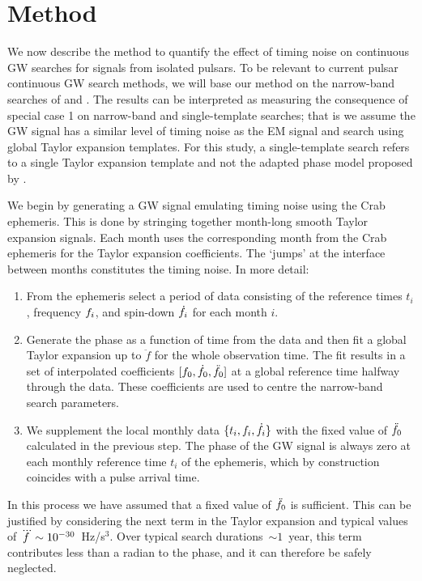 \documentclass[../full_thesis/full_thesis.tex]{subfiles}
\begin{document}
\section{Method}
\label{sec: narrow-band method}
We now describe the method to quantify the effect of timing noise on continuous GW
searches for signals from isolated pulsars.
To be relevant to current pulsar continuous GW search methods, we will base our
method on the narrow-band searches of \citet{abbott2008beating} and \citet{aasi2015narrow}. The results can be interpreted as measuring the consequence of
special case 1 on narrow-band and single-template searches; that is we assume
the GW signal has a similar level of timing noise as the EM signal and search
using global Taylor expansion templates. For this study, a single-template
search refers to a single Taylor expansion template and not the adapted phase
model proposed by \citet{Pitkin2004}.

We begin by generating a GW signal emulating timing noise using the Crab
ephemeris. This is done by stringing together month-long smooth Taylor expansion
signals. Each month uses the corresponding month from the Crab
ephemeris for the Taylor expansion coefficients. The `jumps' at the interface
between months constitutes the timing noise.
In more detail:
\begin{enumerate}

\item From the ephemeris select a period of data consisting of the reference
times $t_i$, frequency $f_i$, and spin-down
$\dot{f}_i$ for each month $i$.

\item \label{fit} Generate the phase as a function of time from the data and
then fit a global Taylor expansion up to $\ddot{f}$ for the whole
observation time.  The fit results in a set of interpolated coefficients
$[f_{0}, \dot{f}_{0}, \ddot{f}_{0}]$ at a global reference time halfway through
the data. These coefficients are used to centre the narrow-band search
parameters.

\item We supplement the local monthly data $\{t_i, f_{i}, \dot{f}_{i}\}$ with
the fixed value of $\ddot{f}_{0}$ calculated in the previous step. The phase of
the GW signal is always zero at each monthly reference time $t_i$ of the
ephemeris, which by construction coincides with a pulse arrival time.

\end{enumerate}

In this process we have assumed that a fixed value of $\ddot{f}_{0}$ is
sufficient. This can be justified by considering the next term in the Taylor
expansion and typical values of $\dddot{f}\sim 10^{-30}$~Hz/s$^{3}$.  Over
typical search durations~$\sim 1$~year, this term contributes
less than a radian to the phase, and it can therefore be safely neglected.
\end{document}
